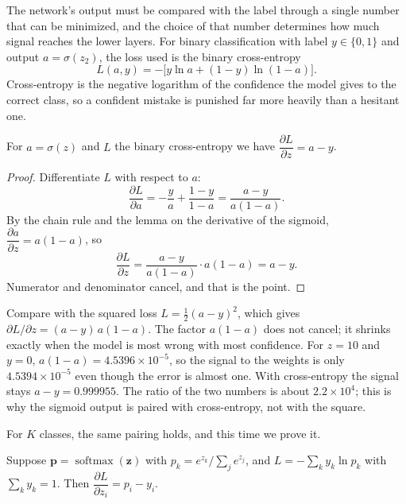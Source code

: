 The network's output must be compared with the label through a single number that can be
minimized, and the choice of that number determines how much signal reaches the lower layers.
For binary classification with label $y\in\{0,1\}$ and output $a=\sigma(z_{2})$, the loss used
is the binary cross-entropy
\[
  L(a,y)=-\bigl[y\ln a+(1-y)\ln(1-a)\bigr].
\]
Cross-entropy is the negative logarithm of the confidence the model gives to the correct class,
so a confident mistake is punished far more heavily than a hesitant one.


\begin{proposisi}
For $a=\sigma(z)$ and $L$ the binary cross-entropy we have
$\dfrac{\partial L}{\partial z}=a-y$.
\end{proposisi}

\begin{proof}
Differentiate $L$ with respect to $a$:
\[
  \frac{\partial L}{\partial a}=-\frac{y}{a}+\frac{1-y}{1-a}
  =\frac{a-y}{a(1-a)} .
\]
By the chain rule and the lemma on the derivative of the sigmoid,
$\dfrac{\partial a}{\partial z}=a(1-a)$, so
\[
  \frac{\partial L}{\partial z}=\frac{a-y}{a(1-a)}\cdot a(1-a)=a-y .
\]
Numerator and denominator cancel, and that is the point.
\end{proof}

Compare with the squared loss $L=\tfrac12(a-y)^{2}$, which gives
$\partial L/\partial z=(a-y)\,a(1-a)$. The factor $a(1-a)$ does not cancel; it shrinks exactly
when the model is most wrong with most confidence. For $z=10$ and $y=0$,
$a(1-a)=4.5396\times10^{-5}$, so the signal to the weights is only $4.5394\times10^{-5}$ even
though the error is almost one. With cross-entropy the signal stays $a-y=0.999955$. The ratio of
the two numbers is about $2.2\times10^{4}$; this is why the sigmoid output is paired with
cross-entropy, not with the square.

For $K$ classes, the same pairing holds, and this time we prove it.


\begin{proposisi}
Suppose $\mathbf{p}=\operatorname{softmax}(\mathbf{z})$ with
$p_{k}=e^{z_{k}}/\sum_{j}e^{z_{j}}$, and $L=-\sum_{k}y_{k}\ln p_{k}$ with
$\sum_{k}y_{k}=1$. Then $\dfrac{\partial L}{\partial z_{i}}=p_{i}-y_{i}$.
\end{proposisi}

